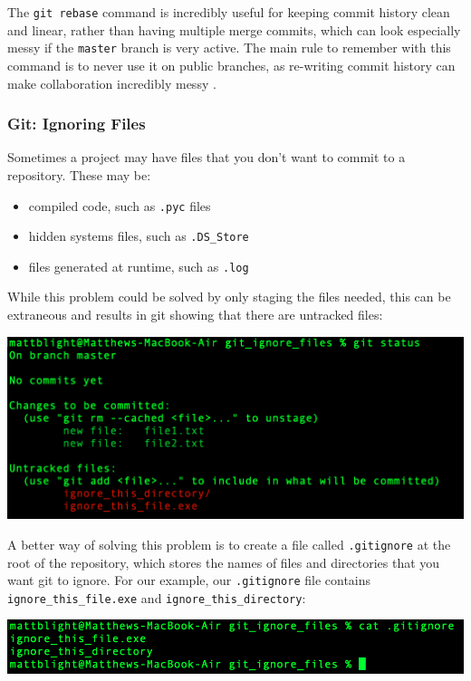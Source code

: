 \documentclass[a4paper, 11pt]{report}
\begin{document}
The \verb|git rebase| command is incredibly useful for keeping commit history clean and linear, rather than having multiple merge commits, which can look especially messy if the \verb|master| branch is very active. The main rule to remember with this command is to never use it on public branches, as re-writing commit history can make collaboration incredibly messy \cite{rebase}.

\subsubsection{Git: Ignoring Files \cite{ignore}}

Sometimes a project may have files that you don’t want to commit to a repository. These may be:

\begin{itemize}
	\item compiled code, such as \verb|.pyc| files
	\item hidden systems files, such as \verb|.DS_Store|
	\item files generated at runtime, such as \verb|.log|
\end{itemize}

While this problem could be solved by only staging the files needed, this can be extraneous and results in git showing that there are untracked files:

\includegraphics[width=\textwidth]{ignore1}

A better way of solving this problem is to create a file called \verb|.gitignore| at the root of the repository, which stores the names of files and directories that you want git to ignore. For our example, our \verb|.gitignore| file contains \verb|ignore_this_file.exe| and \verb|ignore_this_directory|: 

\includegraphics[width=\textwidth]{ignore2}
\end{document}
